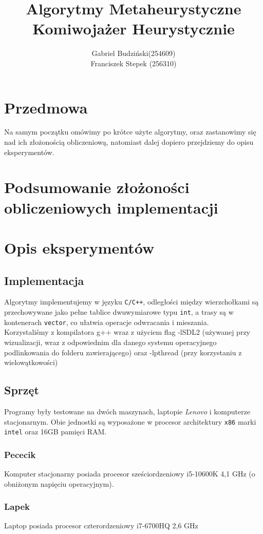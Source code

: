 \documentclass{article}
\title{\textbf{Algorytmy Metaheurystyczne\\Komiwojażer Heurystycznie}}
\author{Gabriel Budziński(254609)\\Franciszek Stepek (256310)}
\date{}
\begin{document}
 
\maketitle

\section*{Przedmowa}
Na samym początku omówimy po krótce użyte algorytmy, oraz zastanowimy się nad ich złożonością obliczeniową, natomiast dalej dopiero przejdziemy do opisu eksperymentów.

\section{Podsumowanie złożoności obliczeniowych implementacji}

\section{Opis eksperymentów}
\subsection{Implementacja}
Algorytmy implementujemy w języku \texttt{C/C++}, odległości między wierzchołkami są przechowywane jako pełne tablice dwuwymiarowe typu \texttt{int}, a trasy są w kontenerach \texttt{vector}, co ułatwia operacje odwracania i mieszania.\\
Korzystaliśmy z kompilatora g++ wraz z użyciem flag -lSDL2 (używanej przy wizualizacji, wraz z odpowiednim dla danego systemu operacyjnego podlinkowania do folderu zawierającego) oraz -lpthread (przy korzystaniu z wielowątkowości)

\subsection{Sprzęt}
Programy były testowane na dwóch maszynach, laptopie \textit{Lenovo} i komputerze stacjonarnym. Obie jednostki są wyposażone w procesor architektury \texttt{x86} marki \texttt{intel} oraz 16GB pamięci RAM.

\subsubsection{Pececik}
Komputer stacjonarny posiada procesor sześciordzeniowy i5-10600K 4,1 GHz (o obniżonym napięciu operacyjnym).
\subsubsection{Lapek}
Laptop posiada procesor czterordzeniowy i7-6700HQ 2,6 GHz
\end{document}

